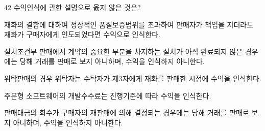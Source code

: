\begin{question}{42}
수익인식에 관한 설명으로 옳지 않은 것은?
\begin{choices}
  \item 재화의 결함에 대하여 정상적인 품질보증범위를 초과하여 판매자가 책임을 지더라도 재화가 구매자에게 인도되었다면 수익으로 인식한다.
  \item 설치조건부 판매에서 계약의 중요한 부분을 차지하는 설치가 아직 완료되지 않은 경우에는 당해 거래를 판매로 보지 아니하며, 수익을 인식하지 아니한다.
  \item 위탁판매의 경우 위탁자는 수탁자가 제3자에게 재화를 판매한 시점에 수익을 인식한다.
  \item 주문형 소프트웨어의 개발수수료는 진행기준에 따라 수익을 인식한다.
  \item 판매대금의 회수가 구매자의 재판매에 의해 결정되는 경우에는 당해 거래를 판매로 보지 아니하며, 수익을 인식하지 아니한다.
\end{choices}
\end{question}
